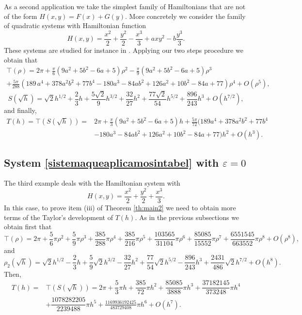 \documentclass[12pt,a4paper,reqno]{amsart}
\begin{document}
As a second application we take the simplest family of Hamiltonians
that are not of the form $H(x,y)=F(x)+G(y).$ More concretely we
consider the family of quadratic systems with Hamiltonian function
\begin{equation*}
H(x,y) = \dfrac{x^2}{2} + \dfrac{y^2}{2} -  \dfrac{x^3}{3} + ax y^2
- b \dfrac{y^3}{3}.
\end{equation*}
These systems are studied for instance in \cite{ArtLli1994,
HorIli1994}. Applying our two steps procedure we obtain that
\begin{multline*}
\top(\rho) = 2 \pi+ \frac{\pi}{6}(9a^2+5b^2-6a+5) \rho^2-
\frac{\pi}{9}(9a^2+5b^2-6a+5) \rho^3\\
+\frac {5\pi }{ 288}\left( 189\,{a}^{4}+378{a}^{2}{b}^{2}+77{b}^{4}-
180{a}^{3}-84a{b}^{2}+126{a}^{2}+10{b}^{2}-84a+77 \right)\rho^4
 + O(\rho^5),
\end{multline*}
\begin{equation*}
S(\sqrt{h})=\sqrt{2}h^{1/2}+\frac{2}{3}h
+\frac{5\sqrt{2}}{9}h^{3/2}+
\frac{32}{27}h^2+\frac{77\sqrt{2}}{54}h^{5/2}+\frac{896}{243}h^3+O(h^{7/2}),
    \end{equation*}
   and finally,
    \begin{align*}
    T (h) =\top(S(\sqrt{h}))= &  2 \pi + \frac{\pi}{3}(9a^2+5b^2-6a+5) h+
    \frac{5\pi}{72}\big(189{a}^{4}+378{a}^{2}{b}^{2}+77{b}^{4}\\
    &-180{a}^{3}-84a{b}^{2}
+126{a}^{2}+10{b}^{2}-84a+77 \big)h^2+O(h^3).
    \end{align*}



\subsection{System \eqref{sistemaqueaplicamosintabel}\label{ss:apl} with $\varepsilon=0$}%

The   third example deals with the Hamiltonian system with
    \[
H(x,y)=\frac{x^2}2+\frac{y^2}2+\frac{x^3}3.
    \]
In this case, to prove item (iii) of Theorem \ref{th:main2} we need
to obtain more terms of the Taylor's development of $T(h)$. As in
the previous subsections we obtain first that
    \begin{equation*}
    \top(\rho) = 2 \pi+\frac{5}{6}\pi\rho^2+\frac{5}{9}\pi\rho^3+\frac{385}{288}\pi\rho^4
    +\frac{385}{216}\pi\rho^5
    +\frac{103565}{31104}\pi\rho^6+   \frac{85085}{15552}\pi\rho^7+
    \frac{6551545}{663552}\pi\rho^8+O(\rho^8),
    \end{equation*}
    and
    \begin{equation*}
    \rho_2(\sqrt{h})=\sqrt{2}h^{1/2}-\frac{2}{3}h +\frac{5}{9}\sqrt{2}h^{3/2}-\frac{32}{27}h^2+
    \frac{77}{54}\sqrt{2}h^{5/2} -\frac{896}{243}h^3+\frac{2431}{486} \sqrt{2}
    h^{7/2}+O(h^8).
    \end{equation*}
Then,
\begin{align}\label{eq:th}
T(h) =&\top(S(\sqrt{h}))=  2 \pi + \dfrac{5}{3} \pi h +
\dfrac{385}{72} \pi h^2 + \dfrac{85085}{3888} \pi h^3  +
\dfrac{37182145}{373248} \pi h^4\nonumber\\ &+
\dfrac{1078282205}{2239488} \pi h^5 +\frac{1169936192425}{483729408}
\pi h^6 +O (h^7).
\end{align}
\end{document}
